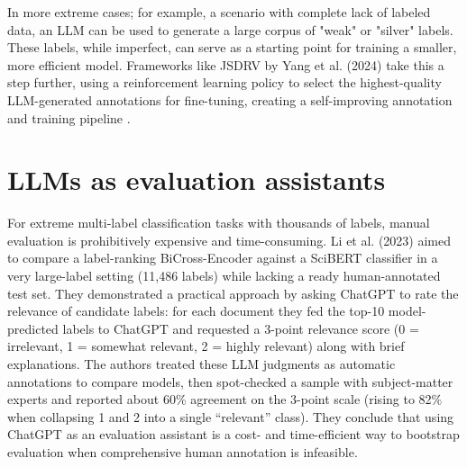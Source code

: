 In more extreme cases; for example, a scenario with complete lack of labeled data, an LLM can be used to generate a large corpus of "weak" or "silver" labels. These labels, while imperfect, can serve as a starting point for training a smaller, more efficient model. Frameworks like JSDRV by Yang et al. (2024) take this a step further, using a reinforcement learning policy to select the highest-quality LLM-generated annotations for fine-tuning, creating a self-improving annotation and training pipeline \cite{yang-etal-2024-reinforcement}.

\section{LLMs as evaluation assistants}
For extreme multi-label classification tasks with thousands of labels, manual evaluation is prohibitively expensive and time-consuming. Li et al. (2023) aimed to compare a label-ranking BiCross-Encoder against a SciBERT classifier in a very large-label setting (11,486 labels) while lacking a ready human-annotated test set. They demonstrated a practical approach by asking ChatGPT to rate the relevance of candidate labels: for each document they fed the top-10 model-predicted labels to ChatGPT and requested a 3-point relevance score (0 = irrelevant, 1 = somewhat relevant, 2 = highly relevant) along with brief explanations. The authors treated these LLM judgments as automatic annotations to compare models, then spot-checked a sample with subject-matter experts and reported about 60\% agreement on the 3-point scale (rising to 82\% when collapsing 1 and 2 into a single ``relevant'' class). They conclude that using ChatGPT as an evaluation assistant is a cost- and time-efficient way to bootstrap evaluation when comprehensive human annotation is infeasible. \cite{li-etal-2023-enhancing-extreme}

